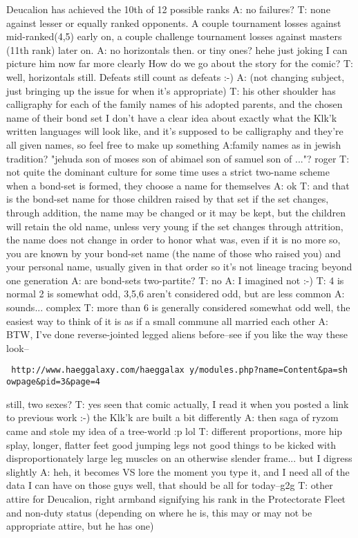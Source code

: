 Deucalion has achieved the 10th of 12 possible ranks
A: no failures?
T: none against lesser or equally ranked opponents. A couple tournament losses against mid-ranked(4,5) early on, a couple challenge tournament losses against masters (11th rank) later on.
A: no horizontals then.
or tiny ones?
hehe
just joking
I can picture him now far more clearly
How do we go about the story for the comic?
T: well, horizontals still. Defeats still count as defeats :-)
A: (not changing subject, just bringing up the issue for when it's appropriate)
T: his other shoulder has calligraphy for each of the family names of his adopted parents, and the chosen name of their bond set
I don't have a clear idea about exactly what the Klk'k written languages will look like, and it's supposed to be calligraphy and they're all given names, so feel free to make up something
A:family names as in jewish tradition? "jehuda son of moses son of abimael son of samuel son of ..."?
roger
T: not quite
the dominant culture for some time uses a strict two-name scheme
when a bond-set is formed, they choose a name for themselves
A: ok
T: and that is the bond-set name for those children raised by that set
if the set changes, through addition, the name may be changed or it may be kept, but the children will retain the old name, unless very young
if the set changes through attrition, the name does not change
in order to honor what was, even if it is no more
so, you are known by your bond-set name (the name of those who raised you) and your personal name, usually given in that order
so it's not lineage tracing beyond one generation
A: are bond-sets two-partite?
T: no
A: I imagined not :-)
T: 4 is normal
2 is somewhat odd, 3,5,6 aren't considered odd, but are less common
A: sounds... complex
T: more than 6 is generally considered somewhat odd
well, the easiest way to think of it is as if a small commune all married each other
A: BTW, I've done reverse-jointed legged aliens before--see if you like the way these look-- 
\begin{verbatim} http://www.haeggalaxy.com/haeggalax y/modules.php?name=Content&pa=sh owpage&pid=3&page=4
\end{verbatim}
still, two sexes?
T: yes
seen that comic actually, I read it when you posted a link to previous work :-)
the Klk'k are built a bit differently
A: then saga of ryzom came and stole my idea of a tree-world :p
lol
T: different proportions, more hip splay, longer, flatter feet
good jumping legs
not good things to be kicked with
disproportionately large leg muscles on an otherwise slender frame... but I digress slightly
A: heh, it becomes VS lore the moment you type it, and I need all of the data I can have on those guys
well, that should be all for today--g2g
T: other attire for Deucalion, right armband signifying his rank in the Protectorate Fleet and non-duty status
(depending on where he is, this may or may not be appropriate attire, but he has one)

